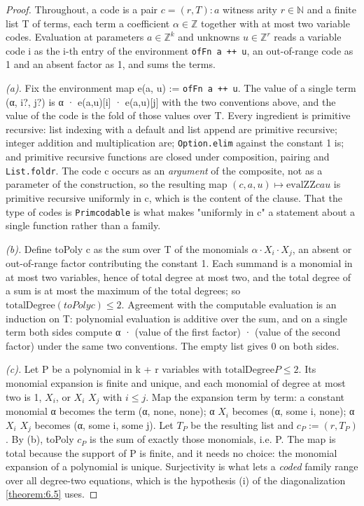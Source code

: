 \documentclass[11pt]{article}
\theoremstyle{plain}
\theoremstyle{definition}
\theoremstyle{remark}
\theoremstyle{plain}
\theoremstyle{definition}
\theoremstyle{remark}
\theoremstyle{plain}
\theoremstyle{definition}
\theoremstyle{remark}
\begin{document}
\begin{proof}
Throughout, a code is a pair $c = (r, T): a$ witness arity $r ∈ ℕ$ and a finite list T of terms, each term a coefficient $α ∈ ℤ$ together with at most two variable codes. Evaluation at parameters $a ∈ ℤ^{k}$ and unknowns $u ∈ ℤ^{r}$ reads a variable code i as the i-th entry of the environment \texttt{ofFn a ++ u}, an out-of-range code as 1 and an absent factor as 1, and sums the terms.

\emph{(a).} Fix the environment map e(a, u) := \texttt{ofFn a ++ u}. The value of a single term (α, i?, j?) is α · e(a,u)[i] · e(a,u)[j] with the two conventions above, and the value of the code is the fold of those values over T. Every ingredient is primitive recursive: list indexing with a default and list append are primitive recursive; integer addition and multiplication are; \texttt{Option.\allowbreak{}elim} against the constant 1 is; and primitive recursive functions are closed under composition, pairing and \texttt{List.\allowbreak{}foldr}. The code c occurs as an \emph{argument} of the composite, not as a parameter of the construction, so the resulting map $(c, a, u) ↦ \mathrm{evalZZ} c a u$ is primitive recursive uniformly in c, which is the content of the clause. That the type of codes is \texttt{Primcodable} is what makes "uniformly in c" a statement about a single function rather than a family.

\emph{(b).} Define toPoly c as the sum over T of the monomials $α·X_{i}·X_{j}$, an absent or out-of-range factor contributing the constant 1. Each summand is a monomial in at most two variables, hence of total degree at most two, and the total degree of a sum is at most the maximum of the total degrees; so $\mathrm{totalDegree} (toPoly c) ≤ 2$. Agreement with the computable evaluation is an induction on T: polynomial evaluation is additive over the sum, and on a single term both sides compute α · (value of the first factor) · (value of the second factor) under the same two conventions. The empty list gives 0 on both sides.

\emph{(c).} Let P be a polynomial in k + r variables with $\mathrm{totalDegree} P ≤ 2$. Its monomial expansion is finite and unique, and each monomial of degree at most two is 1, $X_{i}$, or $X_{i}$ $X_{j}$ with $i ≤ j$. Map the expansion term by term: a constant monomial α becomes the term (α, none, none); α $X_{i}$ becomes (α, some i, none); α $X_{i}$ $X_{j}$ becomes (α, some i, some j). Let $T_{P}$ be the resulting list and $c_{P} := (r, T_{P})$. By (b), toPoly $c_{P}$ is the sum of exactly those monomials, i.e. P. The map is total because the support of P is finite, and it needs no choice: the monomial expansion of a polynomial is unique. Surjectivity is what lets a \emph{coded} family range over all degree-two equations, which is the hypothesis (i) of the diagonalization \cref{theorem:6.5} uses.


\end{proof}
\end{document}
